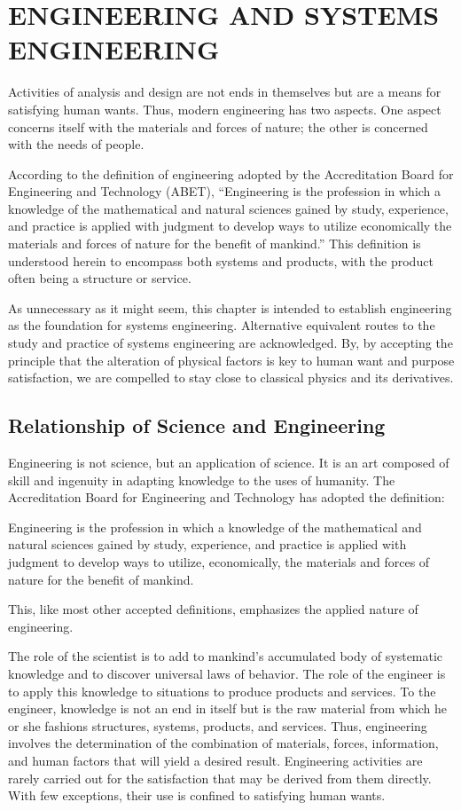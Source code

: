 \chapter{ENGINEERING AND SYSTEMS ENGINEERING}\label{chap:5}

Activities of analysis and design are not ends in themselves but are a means for satisfying human wants. Thus, modern engineering has two aspects. One aspect concerns itself with the materials and forces of nature; the other is concerned with the needs of people.

According to the definition of engineering adopted by the Accreditation Board for Engineering and Technology (ABET), ``Engineering is the profession in which a knowledge of the mathematical and natural sciences gained by study, experience, and practice is applied with judgment to develop ways to utilize economically the materials and forces of nature for the benefit of mankind.'' This definition is understood herein to encompass both systems and products, with the product often being a structure or service.

As unnecessary as it might seem, this chapter is intended to establish engineering as the foundation for systems engineering. Alternative equivalent routes to the study and practice of systems engineering are acknowledged. By, by accepting the principle that the alteration of physical factors is key to human want and purpose satisfaction, we are compelled to stay close to classical physics and its derivatives.

\section{Relationship of Science and Engineering}

Engineering is not science, but an application of science. It is an art composed of skill and ingenuity in adapting knowledge to the uses of humanity. The Accreditation Board for Engineering and Technology has adopted the definition:

Engineering is the profession in which a knowledge of the mathematical and natural sciences gained by study, experience, and practice is applied with judgment to develop ways to utilize, economically, the materials and forces of nature for the benefit of mankind.

This, like most other accepted definitions, emphasizes the applied nature of engineering.

The role of the scientist is to add to mankind’s accumulated body of systematic knowledge and to discover universal laws of behavior. The role of the engineer is to apply this knowledge to situations to produce products and services. To the engineer, knowledge is not an end in itself but is the raw material from which he or she fashions structures, systems, products, and services. Thus, engineering involves the determination of the combination of materials, forces, information, and human factors that will yield a desired result. Engineering activities are rarely carried out for the satisfaction that may be derived from them directly. With few exceptions, their use is confined to satisfying human wants.

